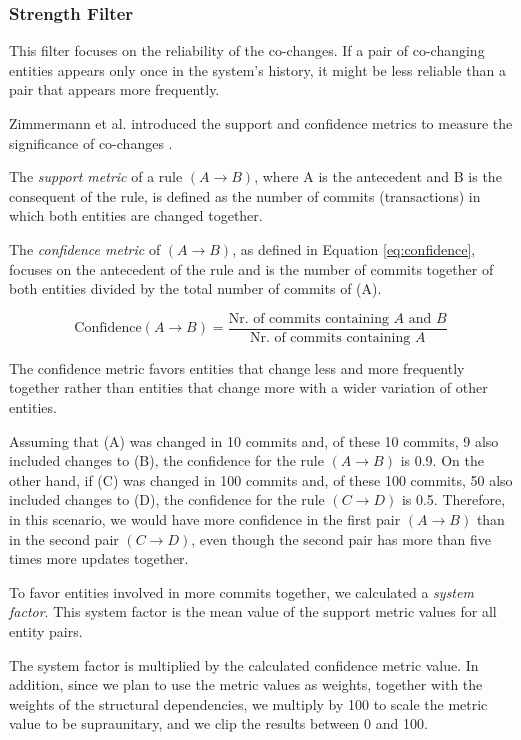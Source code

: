 \documentclass[12pt, a4paper, twoside]{report}
\begin{document}
\subsubsection{Strength Filter}

This filter focuses on the reliability of the co-changes. If a pair of co-changing entities appears only once in the system's history, it might be less reliable than a pair that appears more frequently.

Zimmermann et al. introduced the support and confidence metrics to measure the significance of co-changes \cite{b7}.

The \textit{support metric} of a rule $(A \rightarrow B)$, where A is the antecedent and B is the consequent of the rule, is defined as the number of commits (transactions) in which both entities are changed together.

The \textit{confidence metric} of $(A \rightarrow B)$, as defined in Equation \eqref{eq:confidence}, focuses on the antecedent of the rule and is the number of commits together of both entities divided by the total number of commits of (A).


\begin{equation}
\text{Confidence}(A \rightarrow B) = \frac{\text{Nr. of commits containing } A \text{ and } B}{\text{Nr. of commits containing } A}
\label{eq:confidence}
\end{equation}


The confidence metric favors entities that change less and more frequently together rather than entities that change more with a wider variation of other entities.

Assuming that (A) was changed in 10 commits and, of these 10 commits, 9 also included changes to (B), the confidence for the rule $(A \rightarrow B)$ is 0.9. On the other hand, if (C) was changed in 100 commits and, of these 100 commits, 50 also included changes to (D), the confidence for the rule $(C \rightarrow D)$ is 0.5. Therefore, in this scenario, we would have more confidence in the first pair $(A \rightarrow B)$ than in the second pair $(C \rightarrow D)$, even though the second pair has more than five times more updates together.

To favor entities involved in more commits together, we calculated a \textit{system factor}. This system factor is the mean value of the support metric values for all entity pairs.

The system factor is multiplied by the calculated confidence metric value. In addition, since we plan to use the metric values as weights, together with the weights of the structural dependencies, we multiply by 100 to scale the metric value to be supraunitary, and we clip the results between 0 and 100.
\end{document}
